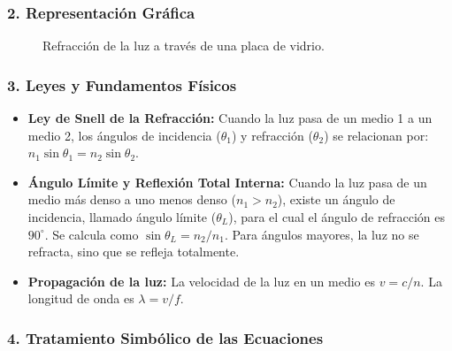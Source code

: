 \subsubsection*{2. Representación Gráfica}
\begin{figure}[H]
    \centering
    \caption{Refracción de la luz a través de una placa de vidrio.}
\end{figure}

\subsubsection*{3. Leyes y Fundamentos Físicos}
\begin{itemize}
    \item \textbf{Ley de Snell de la Refracción:} Cuando la luz pasa de un medio 1 a un medio 2, los ángulos de incidencia ($\theta_1$) y refracción ($\theta_2$) se relacionan por: $n_1 \sin\theta_1 = n_2 \sin\theta_2$.
    \item \textbf{Ángulo Límite y Reflexión Total Interna:} Cuando la luz pasa de un medio más denso a uno menos denso ($n_1 > n_2$), existe un ángulo de incidencia, llamado ángulo límite ($\theta_L$), para el cual el ángulo de refracción es $90^\circ$. Se calcula como $\sin\theta_L = n_2/n_1$. Para ángulos mayores, la luz no se refracta, sino que se refleja totalmente.
    \item \textbf{Propagación de la luz:} La velocidad de la luz en un medio es $v=c/n$. La longitud de onda es $\lambda=v/f$.
\end{itemize}

\subsubsection*{4. Tratamiento Simbólico de las Ecuaciones}
